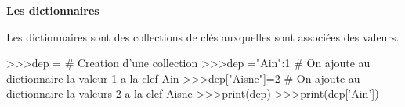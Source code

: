 \documentclass[10pt]{article}
\begin{document}
\begin{py}
\textbf{Les dictionnaires}

Les dictionnaires sont des collections de clés auxquelles sont associées des valeurs.

\begin{python}
>>>dep = {} # Creation d'une collection
>>>dep ={"Ain":1} # On ajoute au dictionnaire la valeur 1 a la clef Ain 
>>>dep["Aisne"]=2 # On ajoute au dictionnaire la valeurs 2 a la clef Aisne
>>>print(dep) 
>>>print(dep['Ain'])
\end{python}
\end{py}


\end{document}
